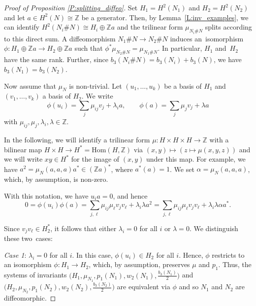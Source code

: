 \documentclass[pdftex]{sigma}
\numberwithin{equation}{section}
\theoremstyle{definition}
\numberwithin{table}{section}
\newcommand{\Z}{\mathbb{Z}}
\begin{document}
\begin{proof}[Proof of Proposition \ref{P:splitting_diffeo}]
	Set $H_1=H^2(N_1)$ and $H_2=H^2(N_2)$ and let $a\in H^2(N)\cong\Z$ be a generator. Then, by Lemma~\ref{L:inv_examples}, we can identify $H^2(N_i\# N)\cong H_i\oplus \Z a$ and the trilinear form $\mu_{N_i\# N}$ splits according to this direct sum. A diffeomorphism $N_1\# N\to N_2\# N$ induces an~isomorphism $\phi\colon H_1\oplus \Z a\to H_2\oplus \Z a$ such that $\phi^*\mu_{N_2\# N}=\mu_{N_1\# N}$. In particular, $H_1$ and~$H_2$ have the same rank. Further, since $b_3(N_i\# N)=b_3(N_i)+b_3(N)$, we have $b_3(N_1)=b_3(N_2)$.
	
	Now assume that $\mu_N$ is non-trivial. Let $(u_1,\dots,u_k)$ be a basis of $H_1$ and $(v_1,\dots,v_k)$ a basis of $H_2$. We write
	\[ \phi(u_i)=\sum_j \mu_{ij} v_j+\lambda_i a,\qquad \phi(a)=\sum_j\mu_j v_j+\lambda a \]
	with $\mu_{ij},\mu_j,\lambda_i,\lambda\in\Z$.
	
	In the following, we will identify a trilinear form $\mu\colon H\times H\times H\to\Z$ with a bilinear map $H\times H\to H^*=\mathrm{Hom}(H,\Z)$ via $(x,y)\mapsto (z\mapsto\mu(x,y,z))$ and we will write $xy\in H^*$ for the image of $(x,y)$ under this map. For example, we have $a^2=\mu_N(a,a,a)a^*\in (\Z a)^*$, where $a^*(a)=1$. We set $\alpha=\mu_N(a,a,a)$, which, by assumption, is non-zero.
	
	With this notation, we have $u_i a=0$, and hence
	\[ 0=\phi(u_i)\phi(a)=\sum_{j,\ell}\mu_{ij}\mu_\ell v_j v_\ell +\lambda_i\lambda a^2=\sum_{j,\ell}\mu_{ij}\mu_\ell v_j v_\ell +\lambda_i\lambda\alpha a^*.  \]
	
	Since $v_j v_\ell\in H_2^*$, it follows that either $\lambda_i=0$ for all $i$ or $\lambda=0$. We distinguish these two~cases:

\emph{Case 1}: $\lambda_i=0$ for all $i$. In this case, $\phi(u_i)\in H_2$ for all $i$. Hence, $\phi$ restricts to an isomorphism $\phi\colon H_1\to H_2$, which, by assumption, preserves $\mu$ and $p_1$. Thus, the systems of invariants $\bigl(H_1,\mu_{N_1},p_1(N_1),w_2(N_1),\tfrac{b_3(N_1)}{2}\bigr)$ and $\bigl(H_2,\mu_{N_2},p_1(N_2),w_2(N_2),\tfrac{b_3(N_2)}{2}\bigr)$ are equivalent via $\phi$ and so $N_1$ and $N_2$ are diffeomorphic.


\end{proof}
\end{document}
